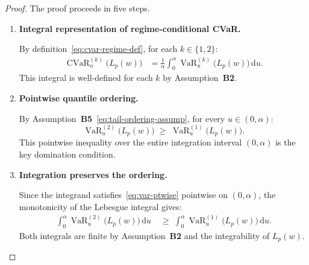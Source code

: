 \documentclass[12pt,openany]{book}
\newcommand{\bfw}{\mathbf{w}}
\DeclareMathOperator{\CVaR}{CVaR}
\DeclareMathOperator{\VaR}{VaR}
\numberwithin{equation}{chapter}
\theoremstyle{plain}
\theoremstyle{definition}
\theoremstyle{remark}
\def\bfw{w}%
\begin{document}
\begin{proof}
The proof proceeds in five steps.

\begin{enumerate}[label=\textbf{Step \arabic*.}, leftmargin=*,
                  widest=Step 5., itemsep=1ex]

  \item \textbf{Integral representation of regime-conditional CVaR.}

        By definition~\eqref{eq:cvar-regime-def}, for each
        $k \in \{1,2\}$:
        \begin{align}
          \CVaR_\alpha^{(k)}\!\bigl(L_p(\bfw)\bigr)
          &= \frac{1}{\alpha}
             \int_0^\alpha
             \VaR_u^{(k)}\!\bigl(L_p(\bfw)\bigr)
             \,\mathrm{d}u.
          \label{eq:cvar-regime-lp}
        \end{align}
        This integral is well-defined for each $k$ by
        Assumption~\textbf{B2}.

  \item \textbf{Pointwise quantile ordering.}

        By Assumption~\textbf{B5}~\eqref{eq:tail-ordering-assump},
        for every $u \in (0,\alpha)$:
        \begin{equation}
          \VaR_u^{(2)}\!\bigl(L_p(\bfw)\bigr)
          \;\geq\;
          \VaR_u^{(1)}\!\bigl(L_p(\bfw)\bigr).
          \label{eq:var-ptwise}
        \end{equation}
        This pointwise inequality over the entire integration
        interval $(0,\alpha)$ is the key domination condition.

  \item \textbf{Integration preserves the ordering.}

        Since the integrand satisfies~\eqref{eq:var-ptwise}
        pointwise on $(0,\alpha)$, the monotonicity of the
        Lebesgue integral gives:
        \begin{align}
          \int_0^\alpha
          \VaR_u^{(2)}\!\bigl(L_p(\bfw)\bigr)\,\mathrm{d}u
          &\;\geq\;
          \int_0^\alpha
          \VaR_u^{(1)}\!\bigl(L_p(\bfw)\bigr)\,\mathrm{d}u.
          \label{eq:integral-ordering}
        \end{align}
        Both integrals are finite by Assumption~\textbf{B2} and
        the integrability of $L_p(\bfw)$.


\end{enumerate}
\end{proof}
\end{document}

